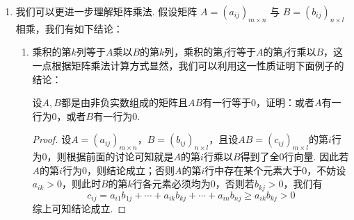 \begin{enumerate}
          若前述$b=0$，则我们将齐次线性方程组的解空间与线性映射的核空间联系起来了，即线性映射的核空间中元素在一组基下的向量就是这一线性映射在这组基下的矩阵表示作为系数矩阵的线性方程组的解. 这一联系将在中有更深入的讨论.

    \item 我们可以更进一步理解矩阵乘法. 假设矩阵 $A = (a_{ij})_{m \times n}$ 与 $B = (b_{ij})_{n \times l}$ 相乘，我们有如下结论：
          \begin{enumerate}
              \item 乘积的第$k$列等于$A$乘以$B$的第$k$列，乘积的第$j$行等于$A$的第$j$行乘以$B$，这一点根据矩阵乘法计算方式显然，我们可以利用这一性质证明下面例子的结论：
                    \begin{example}{}{}
                        设$A,B$都是由非负实数组成的矩阵且$AB$有一行等于0，证明：或者$A$有一行为0，或者$B$有一行为0.
                    \end{example}
                    \begin{proof}
                        设$A=(a_{ij})_{m\times n}$，$B=(b_{ij})_{n\times l}$，且设$AB=(c_{ij})_{m\times l}$的第$i$行为0，则根据前面的讨论可知就是$A$的第$i$行乘以$B$得到了全0行向量. 因此若$A$的第$i$行为0，则结论成立；否则$A$的第$i$行中存在某个元素大于0，不妨设$a_{ik}>0$，则此时$B$的第$k$行各元素必须均为0，否则若$b_{kj}>0$，我们有
                        \[c_{ij}=a_{i1}b_{1j}+\cdots+a_{ik}b_{kj}+\cdots+a_{in}b_{nj}\geqslant a_{ik}b_{kj}>0\]
                        综上可知结论成立.
                    \end{proof}


\end{enumerate}
\end{enumerate}

